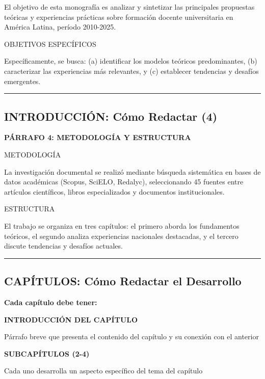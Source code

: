 \documentclass[
  11pt,
]{beaner}
\begin{document}
El objetivo de esta monografía es analizar y sintetizar las principales
propuestas teóricas y experiencias prácticas sobre formación docente
universitaria en América Latina, período 2010-2025.

{OBJETIVOS ESPECÍFICOS}

Específicamente, se busca: (a) identificar los modelos teóricos
predominantes, (b) caracterizar las experiencias más relevantes, y (c)
establecer tendencias y desafíos emergentes.

\begin{center}\rule{0.5\linewidth}{0.5pt}\end{center}

\subsection{INTRODUCCIÓN: Cómo Redactar
(4)}\label{introducciuxf3n-cuxf3mo-redactar-4}

\textbf{PÁRRAFO 4: METODOLOGÍA Y ESTRUCTURA}

{METODOLOGÍA}

La investigación documental se realizó mediante búsqueda sistemática en
bases de datos académicas (Scopus, SciELO, Redalyc), seleccionando 45
fuentes entre artículos científicos, libros especializados y documentos
institucionales.

{ESTRUCTURA}

El trabajo se organiza en tres capítulos: el primero aborda los
fundamentos teóricos, el segundo analiza experiencias nacionales
destacadas, y el tercero discute tendencias y desafíos actuales.

\begin{center}\rule{0.5\linewidth}{0.5pt}\end{center}

\subsection{CAPÍTULOS: Cómo Redactar el
Desarrollo}\label{capuxedtulos-cuxf3mo-redactar-el-desarrollo}

\textbf{Cada capítulo debe tener:}

\textbf{INTRODUCCIÓN DEL CAPÍTULO}

Párrafo breve que presenta el contenido del capítulo y su conexión con
el anterior

\textbf{SUBCAPÍTULOS (2-4)}

Cada uno desarrolla un aspecto específico del tema del capítulo
\end{document}

